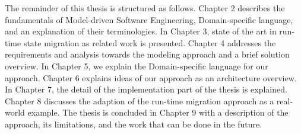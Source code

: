 The remainder of this thesis is structured as follows. Chapter 2 describes the fundamentals of Model-driven Software Engineering, Domain-specific language, and an explanation of their terminologies. In Chapter 3, state of the art in run-time state migration as related work is presented. Chapter 4 addresses the requirements and analysis towards the modeling approach and a brief solution overview. In Chapter 5, we explain the Domain-specific language for our approach. Chapter 6 explains ideas of our approach as an architecture overview. In Chapter 7, the detail of the implementation part of the thesis is explained. Chapter 8 discusses the adaption of the run-time migration approach as a real-world example. The thesis is concluded in Chapter 9 with a description of the approach, its limitations, and the work that can be done in the future.
